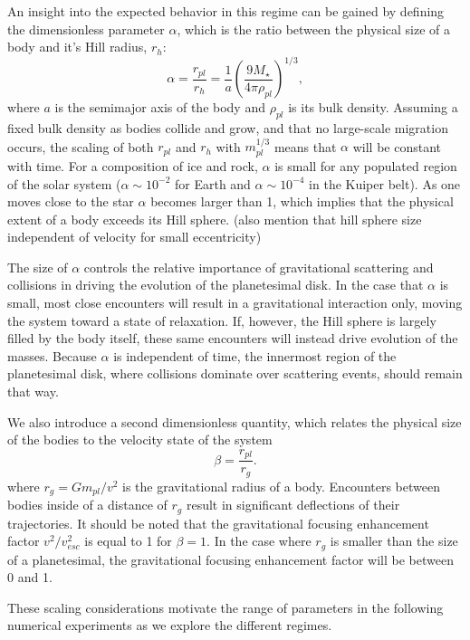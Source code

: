 \documentclass[twocolumn]{aastex63}
\begin{document}
An insight into the expected behavior in this regime can be gained by
defining the dimensionless parameter $\alpha$, which is the ratio
between the physical size of a body and it's Hill radius, $r_{h}$:
\begin{equation}\label{eq:alpha}
	\alpha = \frac{r_{pl}}{r_{h}} = \frac{1}{a} \left( \frac{9 M_{\star}}{4 \pi \rho_{pl}} \right)^{1/3},
\end{equation}
where $a$ is the semimajor axis of the body and $\rho_{pl}$ is its bulk density. Assuming a fixed bulk density as bodies collide and grow, and that no large-scale migration occurs, the scaling of both $r_{pl}$ and $r_{h}$ with $m_{pl}^{1/3}$ means that $\alpha$ will be constant with time. For a composition of ice and rock, $\alpha$ is small for any populated region of the solar system ($\alpha \sim 10^{-2}$ for Earth and $\alpha \sim 10^{-4}$ in the Kuiper belt). As one moves close to the star $\alpha$ becomes larger than 1, which implies that the physical extent of a body exceeds its Hill sphere. (also mention that hill sphere size independent of velocity for small eccentricity)

The size of $\alpha$ controls the relative importance of gravitational scattering and collisions in driving the evolution of the planetesimal disk. In the case that $\alpha$ is small, most close encounters will result in a gravitational interaction only, moving the system toward a state of relaxation. If, however, the Hill sphere is largely filled by the body itself, these same encounters will instead drive evolution of the masses. Because $\alpha$ is independent of time, the innermost region of the planetesimal disk, where collisions dominate over scattering events, should remain that way.

We also introduce a second dimensionless quantity, which relates the physical size of the bodies to the velocity state of the system
\begin{equation}\label{eq:beta}
	\beta = \frac{r_{pl}}{r_{g}}.
\end{equation}
where $r_{g} = G m_{pl} / v^{2}$ is the gravitational radius of a body. Encounters between bodies inside of a distance of $r_{g}$ result in significant deflections of their trajectories. It should be noted that the gravitational focusing enhancement factor $v^{2}/v_{esc}^{2}$ is equal to 1 for $\beta = 1$. In the case where $r_{g}$ is smaller than the size of a planetesimal, the gravitational focusing enhancement factor will be between 0 and 1.

These scaling considerations motivate the range of parameters in the
following numerical experiments as we explore the different regimes.
\end{document}
